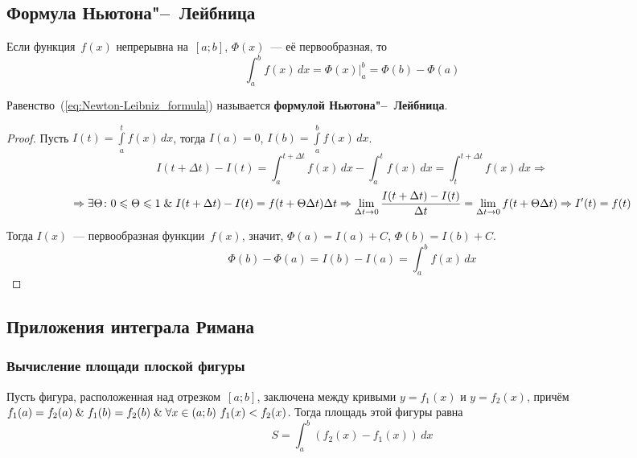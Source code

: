 \subsection{Формула Ньютона"--~Лейбница}
\begin{theorem}
Если функция~$f(x)$ непрерывна на~$[a; b]$, $\Phi(x)$~--- её первообразная, то
\begin{equation}
\label{eq:Newton-Leibniz_formula}
\int_a^b f(x)\,dx = \left. \Phi(x) \right|_a^b = \Phi(b) - \Phi(a)
\end{equation}
\end{theorem}
 Равенство~(\ref{eq:Newton-Leibniz_formula}) называется \textbf{формулой Ньютона"--~Лейбница}.
\begin{proof}
Пусть $I(t) = \int\limits_a^t f(x)\,dx$, тогда $I(a) = 0$, $I(b) = \int\limits_a^b f(x)\,dx$.
\begin{equation*}
I(t + \Delta t) - I(t) =
\int_a^{t+\Delta t} f(x)\,dx - \int_a^t f(x)\,dx =
\int_t^{t + \Delta t} f(x)\,dx \Rightarrow
\end{equation*}
\begin{equation*}
\Rightarrow \exists \Theta \colon 0 \leqslant \Theta \leqslant 1 \mathrel{\&} I(t + \Delta t) - I(t) = f(t + \Theta \Delta t) \Delta t \Rightarrow
\lim_{\Delta t \to 0} \frac{I(t + \Delta t) - I(t)}{\Delta t} = \lim_{\Delta t \to 0} f(t + \Theta \Delta t) \Rightarrow
I'(t) = f(t)
\end{equation*}

Тогда $I(x)$~--- первообразная функции~$f(x)$, значит, $\Phi(a) = I(a) + C$, $\Phi(b) = I(b) + C$.
\begin{equation*}
\Phi(b) - \Phi(a) = I(b) - I(a) = \int_a^b f(x)\,dx
\end{equation*}
\end{proof}

\subsection{Приложения интеграла Римана}
\subsubsection{Вычисление площади плоской фигуры}
Пусть фигура, расположенная над отрезком~$[a; b]$, заключена между кривыми $y = f_1(x)$ и $y = f_2(x)$, причём $f_1(a) = f_2(a) \mathrel{\&} f_1(b) = f_2(b) \mathrel{\&} \forall x \in (a; b) \ f_1(x) < f_2(x)$.
Тогда площадь этой фигуры равна
\begin{equation*}
S = \int_a^b (f_2(x) - f_1(x))\,dx
\end{equation*}


